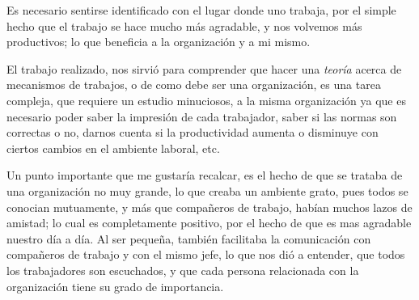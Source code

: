 \begin{itemize}
		Es necesario sentirse identificado con el lugar donde uno trabaja,
		por el simple hecho que el trabajo se hace mucho más agradable, y nos volvemos más
		productivos; lo que beneficia a la organización y a mi mismo.

		El trabajo realizado, nos sirvió para comprender que hacer una \emph{teoría}
		acerca de mecanismos de trabajos, o de como debe ser una organización,
		es una tarea compleja, que requiere un estudio minuciosos, a la misma organización
		ya que es necesario poder saber la impresión de cada trabajador,
		saber si las normas son correctas o no,
		darnos cuenta si la productividad aumenta o disminuye con ciertos cambios en el ambiente laboral, etc.

		Un punto importante que me gustaría recalcar,
		es el hecho de que se trataba de una organización no muy grande,
		lo que creaba un ambiente grato, pues todos se conocian mutuamente,
		y más que compañeros de trabajo, habían muchos lazos de amistad;
		lo cual es completamente positivo, por el hecho de que es mas agradable nuestro día a día.
		Al ser pequeña, también facilitaba la comunicación con compañeros de trabajo y con el mismo jefe,
		lo que nos dió a entender, que todos los trabajadores son escuchados,
		y que cada persona relacionada con la organización tiene su grado de importancia.


\end{itemize}

